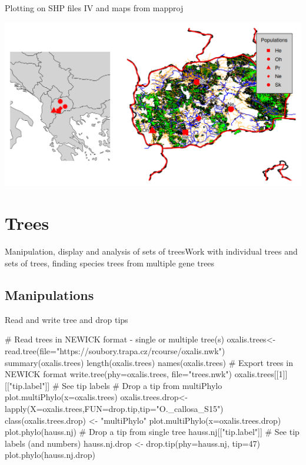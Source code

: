 \documentclass[compress, ucs, xelatex, 11pt, xcolor=svgnames, aspectratio=169,
	hyperref={
		bookmarks=true,
		unicode=true,
		colorlinks=true,
		pdftitle={Molecular data in R},
		plainpages=false,
		pdfauthor={Vojtech Zeisek},
		pdfsubject={Course about phylogeny and evolution in R},
		pdfcreator={XeLaTeX},
		pdfkeywords={R, evolution, phylogeny, molecular data},
		linkcolor=Crimson, %
		anchorcolor=Magenta, %
		citecolor=Magenta, %
		filecolor=Magenta, %
		menucolor=Magenta, %
		urlcolor=DodgerBlue, %
		pdftex},
	url={hyphens, lowtilde} %
	]{beamer}
\begin{document}
\begin{frame}{Plotting on SHP files IV and maps from mapproj}
	\begin{center}
		\includegraphics[width=\textwidth-2cm]{mapy.png}
	\end{center}
\end{frame}

\section{Trees}

\begin{frame}{Manipulation, display and analysis of sets of trees}{Work with individual trees and sets of trees, finding species trees from multiple gene trees}
	\tableofcontents[currentsection, sectionstyle=show/hide, hideothersubsections]
\end{frame}

\subsection{Manipulations}

\begin{frame}[fragile]{Read and write tree and drop tips}
	\begin{spluscode}
    # Read trees in NEWICK format - single or multiple tree(s)
    oxalis.trees<-read.tree(file="https://soubory.trapa.cz/rcourse/oxalis.nwk")
    summary(oxalis.trees)
    length(oxalis.trees)
    names(oxalis.trees)
    # Export trees in NEWICK format
    write.tree(phy=oxalis.trees, file="trees.nwk")
    oxalis.trees[[1]][["tip.label"]] # See tip labels
    # Drop a tip from multiPhylo
    plot.multiPhylo(x=oxalis.trees)
    oxalis.trees.drop<-lapply(X=oxalis.trees,FUN=drop.tip,tip="O._callosa_S15")
    class(oxalis.trees.drop) <- "multiPhylo"
    plot.multiPhylo(x=oxalis.trees.drop)
    plot.phylo(hauss.nj) # Drop a tip from single tree
    hauss.nj[["tip.label"]] # See tip labels (and numbers)
    hauss.nj.drop <- drop.tip(phy=hauss.nj, tip=47)
    plot.phylo(hauss.nj.drop)
	\end{spluscode}
\end{frame}
\end{document}
